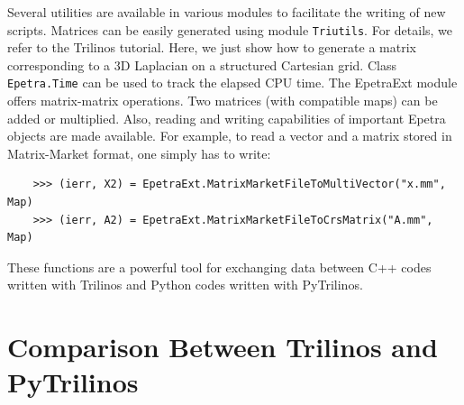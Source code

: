 \documentclass[10pt,relax]{SANDreport}
\newcommand{\PyTrilinos}{{PyTrilinos}}
\begin{document}
Several utilities are available in various modules to facilitate the
writing of new scripts.  Matrices can be easily generated using module
{\tt Triutils}. For details, we refer to the Trilinos tutorial. Here,
we just show how to generate a matrix corresponding to a 3D Laplacian
on a structured Cartesian grid.  Class {\tt Epetra.Time} can be used
to track the elapsed CPU time.  The EpetraExt module offers
matrix-matrix operations. Two matrices (with compatible maps) can be
added or multiplied. Also, reading and writing capabilities of
important Epetra objects are made available. For example, to read a
vector and a matrix stored in Matrix-Market format, one simply has to
write:
\begin{verbatim}
    >>> (ierr, X2) = EpetraExt.MatrixMarketFileToMultiVector("x.mm", Map)
    >>> (ierr, A2) = EpetraExt.MatrixMarketFileToCrsMatrix("A.mm", Map)
\end{verbatim}

These functions are a powerful tool for exchanging data between C++
codes written with Trilinos and Python codes written with \PyTrilinos.

\section{Comparison Between Trilinos and PyTrilinos}
\label{sec:comparision}
\end{document}
